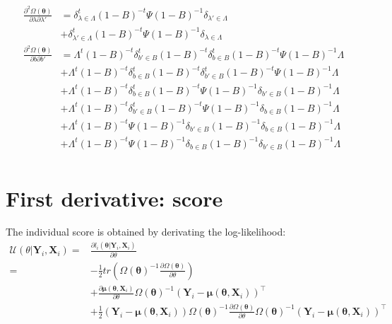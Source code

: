 \documentclass[table]{article}
\newcommand{\VX}{\boldsymbol{X}}
\newcommand{\VY}{\boldsymbol{Y}}
\newcommand{\Vmu}{\boldsymbol{\mu}}
\newcommand{\param}{\theta}
\newcommand{\Vparam}{\boldsymbol{\param}}
\newcommand\Score{\mathcal{U}}
\newcommand\dpartial[2]{\frac{\partial #1}{\partial #2}}
\newcommand\trans[1]{{#1}^\intercal}%
\begin{document}
\begin{align*}
 \frac{\partial^2 \Omega(\Vparam)}{\partial \lambda \partial \lambda'} &= \delta_{\lambda \in \Lambda}^t (1-B)^{-t} \Psi (1-B)^{-1} \delta_{\lambda' \in \Lambda} \\
& + \delta_{\lambda' \in \Lambda}^t (1-B)^{-t} \Psi (1-B)^{-1} \delta_{\lambda \in \Lambda}   \\
 \frac{\partial^2 \Omega(\Vparam)}{\partial b \partial b'} &= \Lambda^t (1-B)^{-t} \delta_{b' \in B}^t (1-B)^{-t} \delta_{b \in B}^t (1-B)^{-t} \Psi (1-B)^{-1} \Lambda \\
& + \Lambda^t (1-B)^{-t} \delta_{b \in B}^t (1-B)^{-t} \delta_{b' \in B}^t (1-B)^{-t} \Psi (1-B)^{-1} \Lambda \\
& + \Lambda^t (1-B)^{-t} \delta_{b \in B}^t (1-B)^{-t} \Psi (1-B)^{-1} \delta_{b' \in B} (1-B)^{-1} \Lambda \\
& + \Lambda^t (1-B)^{-t} \delta_{b' \in B}^t (1-B)^{-t} \Psi (1-B)^{-1} \delta_{b \in B} (1-B)^{-1} \Lambda \\
& + \Lambda^t (1-B)^{-t} \Psi (1-B)^{-1} \delta_{b' \in B} (1-B)^{-1} \delta_{b \in B} (1-B)^{-1} \Lambda \\
& + \Lambda^t (1-B)^{-t} \Psi (1-B)^{-1} \delta_{b \in B} (1-B)^{-1} \delta_{b' \in B} (1-B)^{-1} \Lambda \\
\end{align*}
\section{First derivative: score}
\label{sec:orga852a0f}
The individual score is obtained by derivating the log-likelihood:
\begin{align*}
   \Score(\param|\VY_i,\VX_i) =& \dpartial{l_i(\Vparam|\VY_i,\VX_i)}{\param}\\
 =& - \frac{1}{2} tr\left(\Omega(\Vparam)^{-1} \dpartial{\Omega(\Vparam)}{\param}\right) \\
 &+  \dpartial{\Vmu(\Vparam,\VX_i)}{\param} \Omega(\Vparam)^{-1} \trans{(\VY_i-\Vmu(\Vparam,\VX_i))} \\
 &+ \frac{1}{2} (\VY_i-\Vmu(\Vparam,\VX_i)) \Omega(\Vparam)^{-1} \dpartial{\Omega(\Vparam)}{\param} \Omega(\Vparam)^{-1} \trans{(\VY_i-\Vmu(\Vparam,\VX_i))}
\end{align*}
\end{document}

